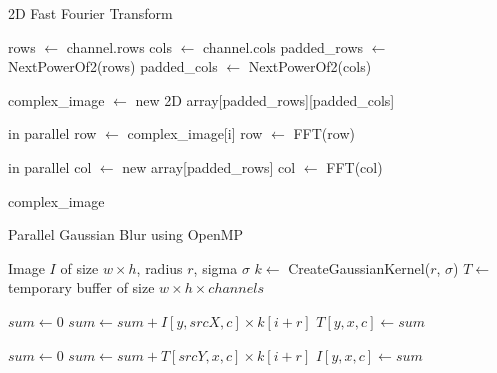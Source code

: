 \documentclass{article}
\begin{document}
\begin{algorithm}
\caption{2D Fast Fourier Transform}
\begin{algorithmic}[1]
    \State rows $\gets$ channel.rows
    \State cols $\gets$ channel.cols
    \State padded\_rows $\gets$ NextPowerOf2(rows)
    \State padded\_cols $\gets$ NextPowerOf2(cols)
    
    \State complex\_image $\gets$ new 2D array[padded\_rows][padded\_cols]
    

     in parallel
        \State row $\gets$ complex\_image[i]
        \State row $\gets$ FFT(row)
    \EndFor
    
     in parallel
        \State col $\gets$ new array[padded\_rows]
        \State col $\gets$ FFT(col)
    \EndFor
    
    \Return complex\_image
\EndProcedure
\end{algorithmic}
\end{algorithm}

\begin{algorithm}
\caption{Parallel Gaussian Blur using OpenMP}
\begin{algorithmic}[1]
\Require Image $I$ of size $w \times h$, radius $r$, sigma $\sigma$
\State $k \gets$ CreateGaussianKernel($r$, $\sigma$)
\State $T \gets$ temporary buffer of size $w \times h \times channels$

            \State $sum \gets 0$
                \State $sum \gets sum + I[y,srcX,c] \times k[i+r]$
            \EndFor
            \State $T[y,x,c] \gets sum$
        \EndFor
    \EndFor
\EndParFor


            \State $sum \gets 0$
                \State $sum \gets sum + T[srcY,x,c] \times k[i+r]$
            \EndFor
            \State $I[y,x,c] \gets sum$
        \EndFor
    \EndFor
\EndParFor

\end{algorithmic}
\end{algorithm}
\end{document}
